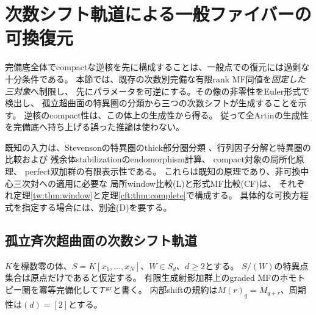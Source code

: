 \section{次数シフト軌道による一般ファイバーの可換復元}
\label{rog:sec:generic}

完備底全体でcompactな逆核を先に構成することは、一般点での復元には過剰な十分条件である。
本節では、既存の次数別完備な有限rank MF同値を\emph{固定した三対象}へ制限し、
先にパラメータを可逆にする。その像の非零性をEuler形式で検出し、
孤立超曲面の特異圏の分類から三つの次数シフトが生成することを示す。
逆核のcompact性は、この体上の生成性から得る。
従って全Artinの生成性を完備底へ持ち上げる誤った推論は使わない。

既知の入力は、Stevensonの特異圏のthick部分圏分類
\cite[Theorem~6.13]{ROGStevenson}、行列因子分解と特異圏の比較および
残余体stabilizationのendomorphism計算\cite[\S2.4, \S5.6]{ROGDyckerhoff}、
compact対象の局所化原理\cite[Proposition~13.37.6]{ROGStacks}、
perfect双加群の有限表示性\cite[Lemmas~2.8, 2.10]{ROGTV}である。
これらは既知の原理であり、非可換中心三次対への適用に必要な
局所window比較(L)と形式MF比較(CF)は、
それぞれ定理\ref{tw:thm:window}と定理\ref{cft:thm:complete}で構成する。
具体的な可換方程式を指定する場合には、別途(D)を要する。

\subsection{孤立斉次超曲面の次数シフト軌道}

$K$を標数零の体、$S=K[x_1,\ldots,x_N]$、$W\in S_d$、$d\ge2$とする。
$S/(W)$の特異点集合は原点だけであると仮定する。
有限生成射影加群上のgraded MFのホモトピー圏を冪等完備化して$\mathcal T^{\rm gr}$と書く。
内部shiftの規約は$M(r)_q=M_{q+r}$、周期性は$(d)=[2]$とする。


